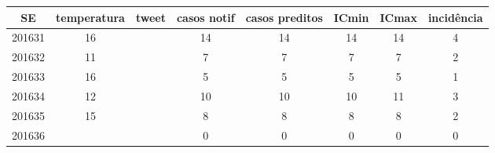 \begin{tabular}{c|ccccccc}
  \hline
SE & temperatura & tweet & casos notif & casos preditos & ICmin & ICmax & incidência \\ 
  \hline
201631 & 16 &  & 14 & 14 & 14 & 14 & 4 \\ 
  201632 & 11 &  & 7 & 7 & 7 & 7 & 2 \\ 
  201633 & 16 &  & 5 & 5 & 5 & 5 & 1 \\ 
  201634 & 12 &  & 10 & 10 & 10 & 11 & 3 \\ 
  201635 & 15 &  & 8 & 8 & 8 & 8 & 2 \\ 
  201636 &  &  & 0 & 0 & 0 & 0 & 0 \\ 
   \hline
\end{tabular}
